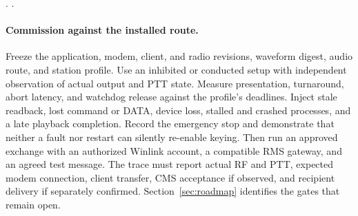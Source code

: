 .
.

\paragraph{Commission against the installed route.}
Freeze the application, modem, client, and radio revisions, waveform
digest, audio route, and station profile. Use an inhibited or conducted
setup with independent observation of actual output and PTT state. Measure
presentation, turnaround, abort latency, and watchdog release against
the profile's deadlines. Inject stale readback, lost command or DATA,
device loss, stalled and crashed processes, and a late playback
completion. Record the emergency stop and demonstrate that neither a
fault nor restart can silently re-enable keying. Then run an approved
exchange with an authorized Winlink account, a compatible RMS gateway,
and an agreed test message. The trace must report actual RF and PTT,
expected modem connection, client transfer, CMS acceptance if observed,
and recipient delivery if separately confirmed. Section~\ref{sec:roadmap}
identifies the gates that remain open.
